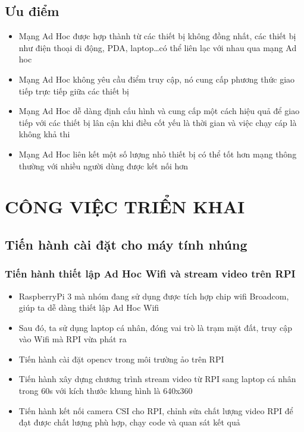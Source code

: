 \documentclass[12pt,a4paper]{report}
\begin{document}
\section{Ưu điểm}
\begin{itemize}
	\item Mạng Ad Hoc được hợp thành từ các thiết bị không đồng nhất, các thiết bị như điện thoại di động, PDA, laptop…có thể liên lạc với nhau qua mạng Ad hoc
	\item Mạng Ad Hoc không yêu cầu điểm truy cập, nó cung cấp phương thức giao tiếp trực tiếp giữa các thiết bị
	\item Mạng Ad Hoc dễ dàng định cấu hình và cung cấp một cách hiệu quả để giao tiếp với các thiết bị lân cận khi điều cốt yếu là thời gian và việc chạy cáp là không khả thi
	\item Mạng Ad Hoc liên kết một số lượng nhỏ thiết bị có thể tốt hơn mạng thông thường với nhiều người dùng được kết nối hơn
\end{itemize}

\newpage         %
\chapter{CÔNG VIỆC TRIỂN KHAI}                    %
\section{Tiến hành cài đặt cho máy tính nhúng}
\subsection{Tiến hành thiết lập Ad Hoc Wifi và stream video trên RPI }
\begin{itemize}
	\item RaspberryPi 3 mà nhóm đang sử dụng được tích hợp chip wifi Broadcom, giúp ta dễ dàng thiết lập Ad Hoc Wifi
	\item Sau đó, ta sử dụng laptop cá nhân, đóng vai trò là trạm mặt đất, truy cập vào Wifi mà RPI vừa phát ra 
	\item Tiến hành cài đặt opencv trong môi trường ảo trên RPI
	\item Tiến hành xây dựng chương trình stream video từ RPI sang laptop cá nhân trong 60s với kích thước khung hình là 640x360
	\item Tiến hành kết nối camera CSI cho RPI, chỉnh sửa chất lượng video RPI để đạt được chất lượng phù hợp, chạy code và quan sát kết quả
\end{itemize}
\end{document}
